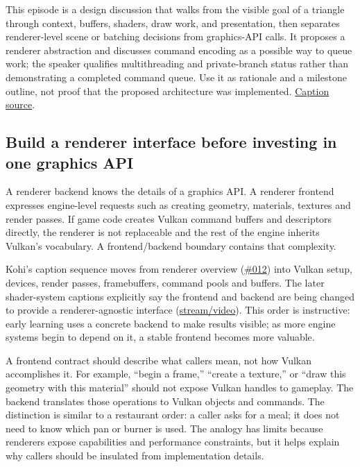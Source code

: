 \hypertarget{06-engine-ii-ch025-separate-a-renderer-plan-from-an-implemented-command-queue}{}

This episode is a design discussion that walks from the visible goal of a triangle through context, buffers, shaders, draw work, and presentation, then separates renderer-level scene or batching decisions from graphics-API calls. It proposes a renderer abstraction and discusses command encoding as a possible way to queue work; the speaker qualifies multithreading and private-branch status rather than demonstrating a completed command queue. Use it as rationale and a milestone outline, not proof that the proposed architecture was implemented. \href{https://www.youtube.com/watch?v=Hoi-Gzk-How}{Caption source}.

\subsection{Build a renderer interface before investing in one graphics API}\label{06-engine-ii-ch025-build-a-renderer-interface-before-investing-in-one-graphics-api}

\hypertarget{06-engine-ii-ch025-build-a-renderer-interface-before-investing-in-one-graphics-api}{}

A renderer backend knows the details of a graphics API. A renderer frontend expresses engine-level requests such as creating geometry, materials, textures and render passes. If game code creates Vulkan command buffers and descriptors directly, the renderer is not replaceable and the rest of the engine inherits Vulkan's vocabulary. A frontend/backend boundary contains that complexity.

Kohi's caption sequence moves from renderer overview (\href{https://www.youtube.com/watch?v=70q9jtjWP4o}{\#012}) into Vulkan setup, devices, render passes, framebuffers, command pools and buffers. The later shader-system captions explicitly say the frontend and backend are being changed to provide a renderer-agnostic interface (\href{https://www.youtube.com/watch?v=4E0v_5Wva-8}{stream/video}). This order is instructive: early learning uses a concrete backend to make results visible; as more engine systems begin to depend on it, a stable frontend becomes more valuable.

A frontend contract should describe what callers mean, not how Vulkan accomplishes it. For example, ``begin a frame,'' ``create a texture,'' or ``draw this geometry with this material'' should not expose Vulkan handles to gameplay. The backend translates those operations to Vulkan objects and commands. The distinction is similar to a restaurant order: a caller asks for a meal; it does not need to know which pan or burner is used. The analogy has limits because renderers expose capabilities and performance constraints, but it helps explain why callers should be insulated from implementation details.

